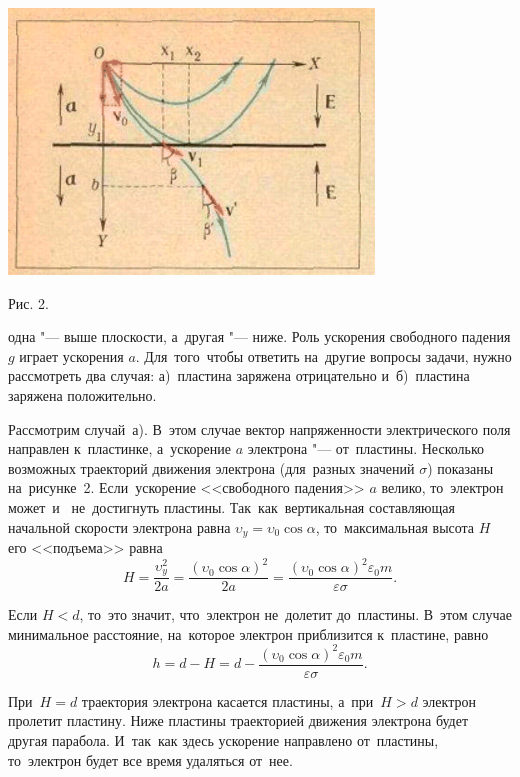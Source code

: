 \documentclass[14pt,a4paper]{scrartcl}
\begin{document}
	\columnsep=30pt
	\begin{multicols}{2}

		\includegraphics{Picture.PNG}

		{\small Рис. 2.}	
		\vspace{3mm}

		одна "--- выше плоскости, а~другая "--- ниже. 
		Роль ускорения свободного падения $g$ играет ускорения $a$.
		Для~того~чтобы ответить на~другие вопросы задачи, нужно рассмотреть два случая: а)~пластина заряжена отрицательно и~б)~пластина заряжена положительно.

		Рассмотрим случай~а). 
		В~этом случае вектор напряженности электрического поля направлен к~пластинке, а~ускорение $a$ электрона "--- от~пластины. 
		Несколько возможных траекторий движения электрона (для~разных значений $\sigma$) показаны на~рисунке~2. 
		Если~ускорение <<свободного падения>> $a$ велико, то~электрон может~и~ не~достигнуть пластины. 
		Так~как~вертикальная составляющая начальной скорости электрона равна $\upsilon_y=\upsilon_0\cos \alpha$, то~максимальная высота $H$ его <<подъема>> равна
		\[
			H=\frac{\upsilon_y^2}{2a}=\frac{(\upsilon_0\cos \alpha)^2}{2a}=
\frac{(\upsilon_0 \cos \alpha)^2 \varepsilon_0 m}{\varepsilon \sigma}. \tag{3} \label{3}
		\]

		Если $H<d$, то~это значит, что~электрон не~долетит до~пластины. В~этом случае минимальное расстояние, на~которое электрон приблизится к~пластине, равно
		\[
			h=d-H=d-\frac{(\upsilon_0 \cos \alpha)^2 \varepsilon_0 m}{\varepsilon \sigma}.		
		\]

		При~$H=d$ траектория электрона касается пластины, а~при~$H>d$ электрон пролетит пластину. Ниже пластины траекторией движения электрона будет другая парабола.
		И~так~как здесь ускорение направлено от~пластины, то~электрон будет все время удаляться от~нее.
		

\end{multicols}
\end{document}
